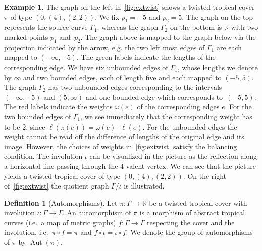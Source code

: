 \documentclass[11pt]{article}
\theoremstyle{definition}
\newtheorem{defi}[theo]{Definition}
\newtheorem{exam}[theo]{Example}
\numberwithin{equation}{section}
\DeclareMathOperator{\Aut}{Aut}
\begin{document}
\begin{exam}
The graph on the left in~\cref{fig:extwist} shows a twisted tropical cover $\pi$ of type $(0,(4),(2,2))$. We fix $p_1=-5$ and $p_2=5$. The graph on the top represents the source curve $\Gamma_1$, whereas the graph $\Gamma_2$ on the bottom is $\mathbb{R}$ with two marked points $p_1$ and~$p_2$. The graph above is mapped to the graph below via the projection indicated by the arrow, e.g. the two left most edges of $\Gamma_1$ are each mapped to $(-\infty,-5)$. The green labels indicate the lengths of the corresponding edge. We have six unbounded edges of $\Gamma_1$, whose lengths we denote by $\infty$ and two bounded edges, each of length five and each mapped to $(-5,5)$. The graph $\Gamma_2$ has two unbounded edges corresponding to the intervals $(-\infty,-5)$ and $(5,\infty)$ and one bounded edge which corresponds to~$(-5,5)$. The red labels indicate the weights $\omega(e)$ of the corresponding edges $e$. For the two bounded edges of $\Gamma_1$, we see immediately that the corresponding weight has to be $2$, since $\ell(\pi(e))=\omega(e)\cdot \ell(e)$. For the unbounded edges the weight cannot be read off the difference of lengths of the original edge and its image. However, the choices of weights in~\cref{fig:extwist} satisfy the balancing condition. The involution $\iota$ can be visualized in the picture as the reflection along a horizontal line passing through the $4$-valent vertex. We can see that the picture
yields a twisted tropical cover of type $(0,(4),(2,2))$. On the right of~\cref{fig:extwist} the quotient graph $\Gamma/\iota$ is illustrated.
\end{exam}

\begin{defi}[Automorphisms]
    Let $\pi:\Gamma\rightarrow \mathbb{R}$ be a twisted tropical cover with involution $\iota:\Gamma\rightarrow \Gamma$. An automorphism of $\pi$ is a morphism of abstract tropical curves (i.e.\ a map of metric graphs) $f:\Gamma\rightarrow\Gamma$ respecting the cover and the involution, i.e.\ $\pi\circ f = \pi$ and $f\circ \iota = \iota \circ f$. We denote the group of automorphisms of $\pi$ by $\Aut(\pi)$.
\end{defi}
\end{document}
